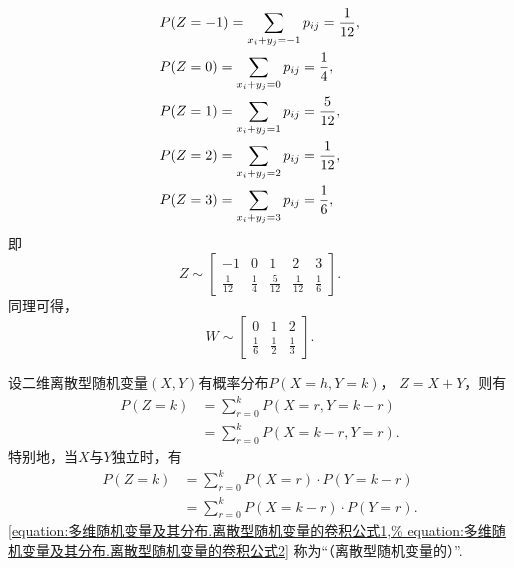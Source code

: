 \begin{example}
\begin{solution}
\begin{align*}
	&P(Z=-1) = \sp{-1} = \frac{1}{12}, \\
	&P(Z=0) = \sp{0} = \frac{1}{4}, \\
	&P(Z=1) = \sp{1} = \frac{5}{12}, \\
	&P(Z=2) = \sp{2} = \frac{1}{12}, \\
	&P(Z=3) = \sp{3} = \frac{1}{6},
\end{align*}
即\begin{equation*}
	Z \sim \begin{bmatrix}
		-1 & 0 & 1 & 2 & 3 \\
		\frac{1}{12} & \frac{1}{4} & \frac{5}{12} & \frac{1}{12} & \frac{1}{6}
	\end{bmatrix}.
\end{equation*}
同理可得，\begin{equation*}
	W \sim \begin{bmatrix}
		0 & 1 & 2 \\
		\frac{1}{6} & \frac{1}{2} & \frac{1}{3}
	\end{bmatrix}.
\end{equation*}
\end{solution}
\end{example}

\begin{theorem}\label{theorem:多维随机变量及其分布.离散型随机变量的卷积公式}
设二维离散型随机变量\((X,Y)\)有概率分布\(P(X=h,Y=k)\)，
\(Z=X+Y\)，则有\begin{align}
	P(Z=k)
	&= \sum_{r=0}^k P(X=r,Y=k-r) \\
	&= \sum_{r=0}^k P(X=k-r,Y=r).
\end{align}
特别地，当\(X\)与\(Y\)独立时，有\begin{align}
	P(Z=k)
	&= \sum_{r=0}^k P(X=r) \cdot P(Y=k-r) \label{equation:多维随机变量及其分布.离散型随机变量的卷积公式1} \\
	&= \sum_{r=0}^k P(X=k-r) \cdot P(Y=r). \label{equation:多维随机变量及其分布.离散型随机变量的卷积公式2}
\end{align}
\rm\cref{equation:多维随机变量及其分布.离散型随机变量的卷积公式1,%
equation:多维随机变量及其分布.离散型随机变量的卷积公式2}
称为“（离散型随机变量的）”.
\end{theorem}

